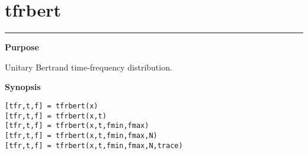 

\renewcommand{\footnoterule}{}
\section*{\hspace*{-1.6cm} tfrbert}

\vspace*{-.4cm}
\hspace*{-1.6cm}\rule[0in]{16.5cm}{.02cm}
\vspace*{.2cm}

{\bf \large \sf Purpose}\\
\hspace*{1.5cm}
\begin{minipage}[t]{13.5cm}
Unitary Bertrand time-frequency distribution.
\end{minipage}
\vspace*{.5cm}

{\bf \large \sf Synopsis}\\
\hspace*{1.5cm}
\begin{minipage}[t]{13.5cm}
\begin{verbatim}
[tfr,t,f] = tfrbert(x)
[tfr,t,f] = tfrbert(x,t)
[tfr,t,f] = tfrbert(x,t,fmin,fmax)
[tfr,t,f] = tfrbert(x,t,fmin,fmax,N)
[tfr,t,f] = tfrbert(x,t,fmin,fmax,N,trace)
\end{verbatim}
\end{minipage}
\vspace*{.5cm}

